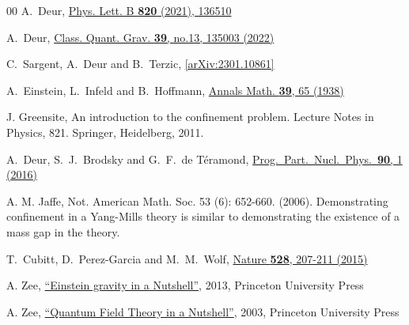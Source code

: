 \documentclass[superscriptaddress,amsmath,amssymb,nofootinbib]{revtex4}
\begin{document}
\begin{thebibliography}{00}
A.~Deur,
\href{https://www.sciencedirect.com/science/article/pii/S0370269321004500}{Phys. Lett. B \textbf{820} (2021), 136510}

A.~Deur,
\href{https://doi.org/10.1088/1361-6382/ac7029}{Class. Quant. Grav. \textbf{39}, no.13, 135003 (2022)}
 
C.~Sargent, A.~Deur and B.~Terzic,
\href{https://arxiv.org/abs/2301.10861}{[arXiv:2301.10861]}
 
 
A.~Einstein, L.~Infeld and B.~Hoffmann,
\href{https://www.jstor.org/stable/1968714?origin=crossref&seq=1#page_scan_tab_contents}{Annals Math.  {\bf 39}, 65 (1938)}

J. Greensite,
An introduction to the confinement problem. Lecture Notes in Physics,
821. Springer, Heidelberg, 2011. %
 
  A.~Deur, S.~J.~Brodsky and G.~F.~de T\'eramond,
\href{http://www.sciencedirect.com/science/article/pii/S0146641016300035}{Prog.\ Part.\ Nucl.\ Phys.\  {\bf 90}, 1 (2016)}

A. M. Jaffe,  
Not. American Math. Soc. 53 (6): 652-660. (2006). Demonstrating confinement in a Yang-Mills theory is similar to demonstrating the existence of a mass gap in the theory. 

T.~Cubitt, D.~Perez-Garcia and M.~M.~Wolf,
\href{https://doi.org/10.1038/nature16059}{Nature \textbf{528}, 207-211 (2015)}

A. Zee, \href{https://press.princeton.edu/books/hardcover/9780691145587/einstein-gravity-in-a-nutshell}{``Einstein gravity in a Nutshell''}, 
2013, Princeton University Press

A. Zee, \href{https://press.princeton.edu/titles/9227.html}{``Quantum Field Theory in a Nutshell''}, 
2003, Princeton University Press



\end{thebibliography}
\end{document}
